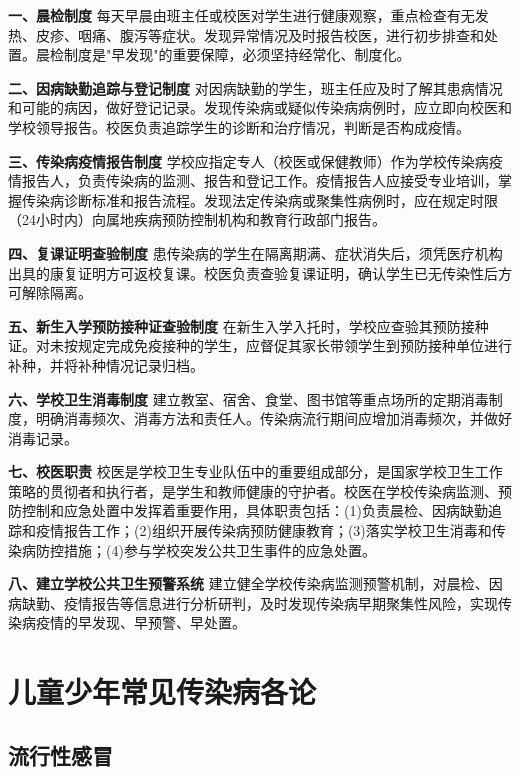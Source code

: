 \begin{keybox}
\textbf{一、晨检制度}
每天早晨由班主任或校医对学生进行健康观察，重点检查有无发热、皮疹、咽痛、腹泻等症状。发现异常情况及时报告校医，进行初步排查和处置。晨检制度是"早发现"的重要保障，必须坚持经常化、制度化。

\textbf{二、因病缺勤追踪与登记制度}
对因病缺勤的学生，班主任应及时了解其患病情况和可能的病因，做好登记记录。发现传染病或疑似传染病病例时，应立即向校医和学校领导报告。校医负责追踪学生的诊断和治疗情况，判断是否构成疫情。

\textbf{三、传染病疫情报告制度}
学校应指定专人（校医或保健教师）作为学校传染病疫情报告人，负责传染病的监测、报告和登记工作。疫情报告人应接受专业培训，掌握传染病诊断标准和报告流程。发现法定传染病或聚集性病例时，应在规定时限（24小时内）向属地疾病预防控制机构和教育行政部门报告。

\textbf{四、复课证明查验制度}
患传染病的学生在隔离期满、症状消失后，须凭医疗机构出具的康复证明方可返校复课。校医负责查验复课证明，确认学生已无传染性后方可解除隔离。

\textbf{五、新生入学预防接种证查验制度}
在新生入学入托时，学校应查验其预防接种证。对未按规定完成免疫接种的学生，应督促其家长带领学生到预防接种单位进行补种，并将补种情况记录归档。

\textbf{六、学校卫生消毒制度}
建立教室、宿舍、食堂、图书馆等重点场所的定期消毒制度，明确消毒频次、消毒方法和责任人。传染病流行期间应增加消毒频次，并做好消毒记录。

\textbf{七、校医职责}
校医是学校卫生专业队伍中的重要组成部分，是国家学校卫生工作策略的贯彻者和执行者，是学生和教师健康的守护者。校医在学校传染病监测、预防控制和应急处置中发挥着重要作用，具体职责包括：(1)负责晨检、因病缺勤追踪和疫情报告工作；(2)组织开展传染病预防健康教育；(3)落实学校卫生消毒和传染病防控措施；(4)参与学校突发公共卫生事件的应急处置。

\textbf{八、建立学校公共卫生预警系统}
建立健全学校传染病监测预警机制，对晨检、因病缺勤、疫情报告等信息进行分析研判，及时发现传染病早期聚集性风险，实现传染病疫情的早发现、早预警、早处置。
\end{keybox}

\section{儿童少年常见传染病各论}

\subsection{流行性感冒}

